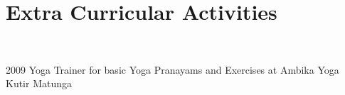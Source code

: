 \documentclass[]{friggeri-cv}
\begin{document}
\section{Extra Curricular Activities}
\\
\begin{entrylist}
  \entry
    {2009}
    {Yoga Trainer for basic Yoga Pranayams and Exercises at Ambika Yoga Kutir}
    {Matunga}
    {\\}
   \end{entrylist}
% 
\end{document}
